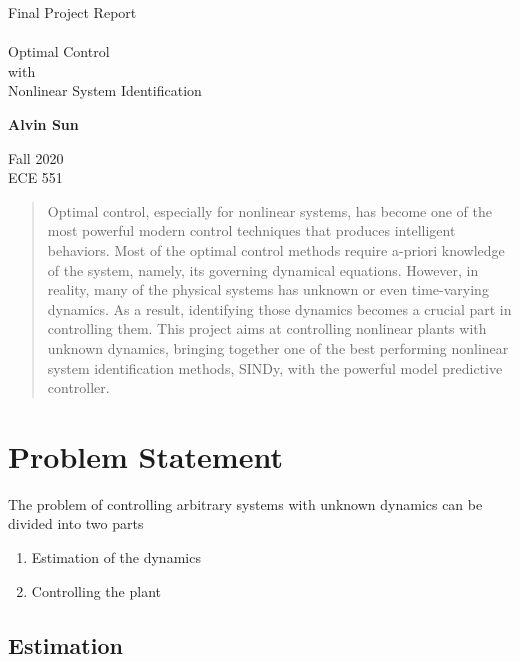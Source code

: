 \documentclass[10pt,twocolumn]{article}
\begin{document}
\begin{titlepage}
  \begin{center}
    \Huge
    Final Project Report \\
    \hfill \\
    Optimal Control \\ with \\ Nonlinear System Identification

    \vfill

    \Large
    \textbf{Alvin Sun} \\

    \vfill

    Fall 2020 \\
    ECE 551

  \end{center}
\end{titlepage}

\begin{abstract}
  Optimal control, especially for nonlinear systems, has become one of the most powerful
  modern control techniques that produces intelligent behaviors. Most of the optimal control
  methods require a-priori knowledge of the system, namely, its governing dynamical equations.
  However, in reality, many of the physical systems has unknown or even time-varying dynamics.
  As a result, identifying those dynamics becomes a crucial part in controlling them.
  This project aims at controlling nonlinear plants with unknown dynamics, bringing together
  one of the best performing nonlinear system identification methods, SINDy, with the
  powerful model predictive controller.
\end{abstract}

\section{Problem Statement}

The problem of controlling arbitrary systems with unknown dynamics can be divided into
two parts
\begin{enumerate}
  \item Estimation of the dynamics
  \item Controlling the plant
\end{enumerate}

\subsection{Estimation}
\end{document}
